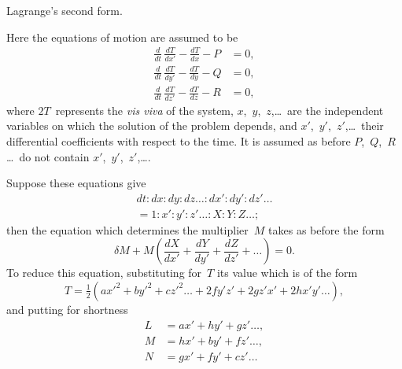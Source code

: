 \documentclass[11pt,a4paper]{book}
\begin{document}
\vspace{10pt}

 Lagrange's second form.

Here the equations of motion are assumed to be
\begin{align*}
\frac{d}{dt}\,\frac{dT}{dx'} - \frac{dT}{dx} - P &= 0,\\
\frac{d}{dt}\,\frac{dT}{dy'} - \frac{dT}{dy} - Q &= 0,\\
\frac{d}{dt}\,\frac{dT}{dz'} - \frac{dT}{dz} - R &= 0,
\end{align*}
where $2T$~represents the \textit{vis viva} of the system, $x$,~$y$,~$z$,\ldots\ are the independent variables on which the solution of the problem depends, and $x'$,~$y'$,~$z'$,\ldots\ their differential coefficients with respect to the time. It is assumed as before $P$,~$Q$,~$R$\ldots\ do not contain $x'$,~$y'$,~$z'$,\ldots.

Suppose these equations give
\begin{multline*}
dt : dx : dy : dz\ldots : dx' : dy' : dz'\ldots \\
= 1 : x' : y' : z'\ldots : X : Y : Z\ldots;
\end{multline*}
then the equation which determines the multiplier~$M$ takes as before the form
\[
\delta M + M\left(\frac{dX}{dx'} + \frac{dY}{dy'} + \frac{dZ}{dz'} + \ldots\right) = 0.
\]
To reduce this equation, substituting for~$T$ its value which is of the form
\[
T = \tfrac{1}{2}(ax'^2 + by'^2 + cz'^2\ldots + 2fy'z' + 2gz'x' + 2hx'y'\ldots),
\]
and putting for shortness
\begin{align*}
L &= ax' + hy' + gz'\ldots,\\
M &= hx' + by' + fz'\ldots,\\
N &= gx' + fy' + cz'\ldots
\end{align*}
\end{document}
